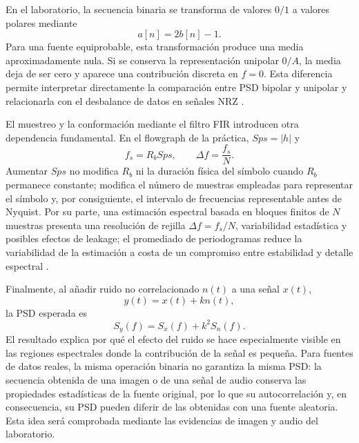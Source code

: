 \documentclass[journal]{IEEEtran}
\begin{document}
En el laboratorio, la secuencia binaria se transforma de valores $0/1$ a valores polares mediante
\begin{equation}
a[n]=2b[n]-1.
\label{eq:polar}
\end{equation}
Para una fuente equiprobable, esta transformación produce una media aproximadamente nula. Si se conserva la representación unipolar $0/A$, la media deja de ser cero y aparece una contribución discreta en $f=0$. Esta diferencia permite interpretar directamente la comparación entre PSD bipolar y unipolar y relacionarla con el desbalance de datos en señales NRZ \cite{Bishop1998}.

El muestreo y la conformación mediante el filtro FIR introducen otra dependencia fundamental. En el flowgraph de la práctica, $Sps=|h|$ y
\begin{equation}
f_s=R_bSps,\qquad \Delta f=\frac{f_s}{N}.
\label{eq:fs_df}
\end{equation}
Aumentar $Sps$ no modifica $R_b$ ni la duración física del símbolo cuando $R_b$ permanece constante; modifica el número de muestras empleadas para representar el símbolo y, por consiguiente, el intervalo de frecuencias representable antes de Nyquist. Por su parte, una estimación espectral basada en bloques finitos de $N$ muestras presenta una resolución de rejilla $\Delta f=f_s/N$, variabilidad estadística y posibles efectos de leakage; el promediado de periodogramas reduce la variabilidad de la estimación a costa de un compromiso entre estabilidad y detalle espectral \cite{Parhi2014,Jwo2021,Pech2023}.

Finalmente, al añadir ruido no correlacionado $n(t)$ a una señal $x(t)$,
\begin{equation}
y(t)=x(t)+kn(t),
\end{equation}
la PSD esperada es
\begin{equation}
S_y(f)=S_x(f)+k^2S_n(f).
\label{eq:sn}
\end{equation}
El resultado explica por qué el efecto del ruido se hace especialmente visible en las regiones espectrales donde la contribución de la señal es pequeña. Para fuentes de datos reales, la misma operación binaria no garantiza la misma PSD: la secuencia obtenida de una imagen o de una señal de audio conserva las propiedades estadísticas de la fuente original, por lo que su autocorrelación y, en consecuencia, su PSD pueden diferir de las obtenidas con una fuente aleatoria. Esta idea será comprobada mediante las evidencias de imagen y audio del laboratorio.
\end{document}
